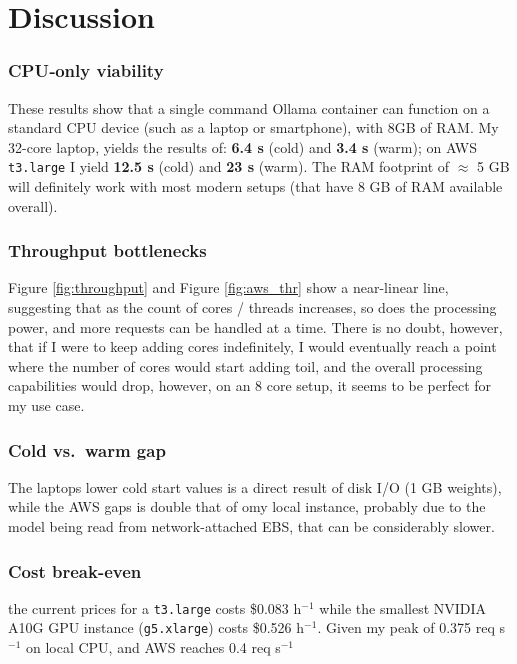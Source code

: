 \documentclass[conference]{IEEEtran}
\begin{document}
\section{Discussion}\label{sec:discussion}
\subsubsection*{CPU‐only viability}
These results show that a single command Ollama container can function on a standard CPU device (such as a laptop or smartphone), with 8GB of RAM. My 32-core laptop, yields the results of: {\bf 6.4 s} (cold) and {\bf 3.4 s} (warm); on AWS \texttt{t3.large} I yield {\bf 12.5 s} (cold) and {\bf 23 s} (warm). The RAM footprint of \(\approx\) 5 GB will definitely work with most modern setups (that have 8 GB of RAM available overall).

\subsubsection*{Throughput bottlenecks}
Figure \ref{fig:throughput} and Figure \ref{fig:aws_thr} show a near-linear
line, suggesting that as the count of cores / threads increases, so does the processing power, and more requests can be handled at a time. There is no doubt, however, that if I were to keep adding cores indefinitely, I would eventually reach a point where the number of cores would start adding toil, and the overall processing capabilities would drop, however, on an 8 core setup, it seems to be perfect for my use case. 


\subsubsection*{Cold vs.\ warm gap}
The laptops lower cold start values is a direct result of disk I/O (1 GB weights), while the AWS gaps is double that of omy local instance, probably due to the model being read from network-attached EBS, that can be considerably slower.

\subsubsection*{Cost break-even}
the current prices for a \texttt{t3.large} costs
\$0.083 h$^{-1}$ while the smallest NVIDIA A10G GPU instance
(\texttt{g5.xlarge}) costs \$0.526 h$^{-1}$.  
Given my peak of {\small0.375 req s$^{-1}$} on local CPU, and AWS reaches {\small0.4 req s$^{-1}$}
\end{document}
